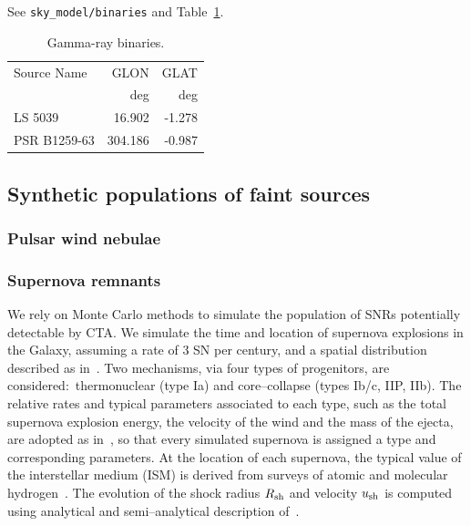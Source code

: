 \documentclass{article}
\begin{document}
See \verb=sky_model/binaries= and Table~\ref{tab:binaries}.

\begin{table}[t]
\caption{
%
Gamma-ray binaries.
%
}
\label{tab:binaries}
\centering
\begin{tabular}{lrr}
\hline
Source Name  & GLON & GLAT \\
             & deg & deg \\
\hline
LS 5039      & 16.902 & -1.278 \\
PSR B1259-63 & 304.186 & -0.987 \\
\hline
\end{tabular}
\end{table}

\subsection{Synthetic populations of faint sources}

\subsubsection{Pulsar wind nebulae}

\subsubsection{Supernova remnants}

We rely on Monte Carlo methods to simulate the population of SNRs potentially detectable by CTA. 
We simulate the time and location of supernova explosions in the Galaxy, assuming a rate of 3 SN per century, and a spatial distribution described as in~\cite{faucher}. Two mechanisms, via four types of progenitors, are considered:~thermonuclear (type Ia) and core--collapse (types Ib/c, IIP, IIb). The relative rates and typical parameters associated to each type, such as the total supernova explosion energy, the velocity of the wind and the mass of the ejecta, are adopted as in~\cite{seo}, so that every simulated supernova is assigned a type and corresponding parameters. 
At the location of each supernova, the typical value of the interstellar medium (ISM) is derived from surveys of atomic and molecular hydrogen~\cite{H1,H2}. The evolution of the shock radius $R_{\rm sh}$ and velocity $u_{\rm sh}$ is computed using analytical and semi--analytical description of~\cite{chevalier,pz05}. 
\end{document}
